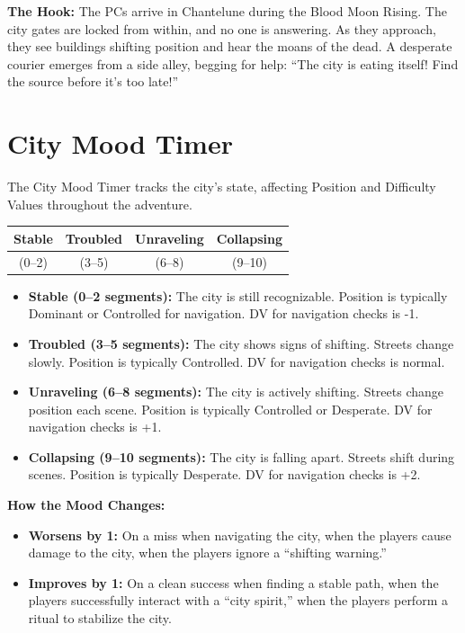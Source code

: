\documentclass{article}
\begin{document}
\begin{storybox}
\textbf{The Hook:} The PCs arrive in Chantelune during the Blood Moon Rising. The city gates are locked from within, and no one is answering. As they approach, they see buildings shifting position and hear the moans of the dead. A desperate courier emerges from a side alley, begging for help: ``The city is eating itself! Find the source before it's too late!''
\end{storybox}

\section{City Mood Timer }

The City Mood Timer tracks the city's state, affecting Position and Difficulty Values throughout the adventure.

\begin{center}
\begin{longtable}{|c|c|c|c|}
\hline
\textbf{Stable} & \textbf{Troubled} & \textbf{Unraveling} & \textbf{Collapsing} \\
\hline
(0--2) & (3--5) & (6--8) & (9--10) \\
\hline
\end{longtable}
\end{center}

\begin{itemize}
    \item \textbf{Stable (0--2 segments):} The city is still recognizable. Position is typically Dominant or Controlled for navigation. DV for navigation checks is -1.
    \item \textbf{Troubled (3--5 segments):} The city shows signs of shifting. Streets change slowly. Position is typically Controlled. DV for navigation checks is normal.
    \item \textbf{Unraveling (6--8 segments):} The city is actively shifting. Streets change position each scene. Position is typically Controlled or Desperate. DV for navigation checks is +1.
    \item \textbf{Collapsing (9--10 segments):} The city is falling apart. Streets shift during scenes. Position is typically Desperate. DV for navigation checks is +2.
\end{itemize}

\textbf{How the Mood Changes:}
\begin{itemize}
    \item \textbf{Worsens by 1:} On a miss when navigating the city, when the players cause damage to the city, when the players ignore a ``shifting warning.''
    \item \textbf{Improves by 1:} On a clean success when finding a stable path, when the players successfully interact with a ``city spirit,'' when the players perform a ritual to stabilize the city.
\end{itemize}
\end{document}
